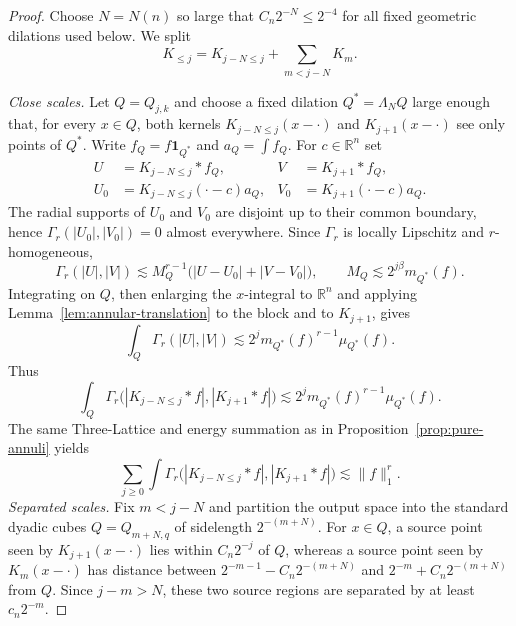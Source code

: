 \documentclass[11pt]{amsart}
\numberwithin{equation}{section}
\theoremstyle{definition}
\theoremstyle{remark}
\newcommand{\R}{\mathbb R}
\newcommand{\norm}[1]{\lVert #1\rVert}
\begin{document}
\begin{proof}
Choose $N=N(n)$ so large that $C_n2^{-N}\le2^{-4}$ for all fixed geometric
dilations used below.  We split
\[
 K_{\le j}=K_{j-N\le j}+\sum_{m<j-N}K_m.
\]

\emph{Close scales.}
Let $Q=Q_{j,k}$ and choose a fixed dilation $Q^*=\Lambda_NQ$ large enough
that, for every $x\in Q$, both kernels $K_{j-N\le j}(x-\cdot)$ and
$K_{j+1}(x-\cdot)$ see only points of $Q^*$.  Write
$f_Q=f\mathbf1_{Q^*}$ and $a_Q=\int f_Q$.  For $c\in\R^n$ set
\[
\begin{aligned}
 U&=K_{j-N\le j}*f_Q, & V&=K_{j+1}*f_Q,\\
 U_0&=K_{j-N\le j}(\cdot-c)a_Q,
 &V_0&=K_{j+1}(\cdot-c)a_Q.
\end{aligned}
\]
The radial supports of $U_0$ and $V_0$ are disjoint up to their common
boundary, hence $\Gamma_r(|U_0|,|V_0|)=0$ almost everywhere.  Since
$\Gamma_r$ is locally Lipschitz and $r$-homogeneous,
\[
 \Gamma_r(|U|,|V|)
 \lesssim M_Q^{r-1}\bigl(|U-U_0|+|V-V_0|\bigr),
 \qquad M_Q\lesssim 2^{j\beta}m_{Q^*}(f).
\]
Integrating on $Q$, then enlarging the $x$-integral to $\R^n$ and applying
Lemma~\ref{lem:annular-translation} to the block and to $K_{j+1}$, gives
\[
 \int_Q\Gamma_r(|U|,|V|)
 \lesssim 2^j m_{Q^*}(f)^{r-1}
 \mu_{Q^*}(f).
\]
Thus
\begin{equation}\label{eq:close-local}
 \int_Q\Gamma_r\bigl(|K_{j-N\le j}*f|,|K_{j+1}*f|\bigr)
 \lesssim2^j m_{Q^*}(f)^{r-1}\mu_{Q^*}(f).
\end{equation}
The same Three-Lattice and energy summation as in
Proposition~\ref{prop:pure-annuli} yields
\begin{equation}\label{eq:close-sum}
 \sum_{j\ge0}\int
 \Gamma_r\bigl(|K_{j-N\le j}*f|,|K_{j+1}*f|\bigr)
 \lesssim\norm f_1^r.
\end{equation}
\emph{Separated scales.}
Fix $m<j-N$ and partition the output space into the
standard dyadic cubes $Q=Q_{m+N,q}$ of sidelength $2^{-(m+N)}$.
For $x\in Q$, a source point seen by $K_{j+1}(x-\cdot)$ lies within
$C_n2^{-j}$ of $Q$, whereas a source point seen by $K_m(x-\cdot)$ has distance
between $2^{-m-1}-C_n2^{-(m+N)}$ and
$2^{-m}+C_n2^{-(m+N)}$ from $Q$.  Since $j-m>N$, these two source regions are
separated by at least $c_n2^{-m}$.


\end{proof}
\end{document}
